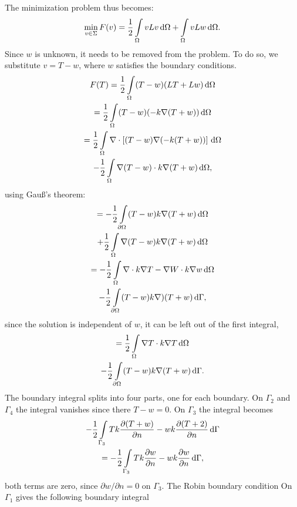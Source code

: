 The minimization problem thus becomes:
\begin{equation}
    \min_{v\in\Sigma} F(v)=\frac{1}{2}\int\displaylimits_{\Omega}vLv \,\mathrm{d}\Omega + \int\displaylimits_{\Omega}vLw \,\mathrm{d}\Omega.
\end{equation} Since $w$ is unknown, it needs to be removed from the problem. To do so, we substitute $v=T-w$, where $w$ satisfies the boundary conditions.
\begin{gather*}
    F(T) = \frac{1}{2}\int\displaylimits_\Omega(T-w)(LT+Lw) \,\mathrm{d}\Omega\\
    = \frac{1}{2}\int\displaylimits_{\Omega}(T-w)(-k\nabla (T+w)) \,\mathrm{d}\Omega\\
    = \frac{1}{2}\int\displaylimits_{\Omega}\nabla\cdot\left[(T-w)\nabla(-k(T+w))\right] \,\mathrm{d}\Omega\\
    - \frac{1}{2}\int\displaylimits_{\Omega}\nabla(T-w)\cdot k\nabla(T+w) \,\mathrm{d}\Omega,
\end{gather*}using Gau\ss's theorem:
\begin{gather*}
    = -\frac{1}{2}\int\displaylimits_{\partial\Omega}(T-w)k\nabla(T+w) \,\mathrm{d}\Omega\\
    + \frac{1}{2}\int\displaylimits_{\Omega}\nabla(T-w)k\nabla(T+w) \,\mathrm{d}\Omega\\
    = -\frac{1}{2}\int\displaylimits_{\Omega}\nabla\cdot k\nabla T - \nabla W\cdot k\nabla w \,\mathrm{d}\Omega\\
    -\frac{1}{2}\int\displaylimits_{\partial\Omega}(T-w)k\nabla)(T+w)\,\mathrm{d}\Gamma,
\end{gather*}since the solution is independent of $w$, it can be left out of the first integral,
\begin{gather*}
    = \frac{1}{2}\int\displaylimits_{\Omega}\nabla T\cdot k\nabla T \,\mathrm{d}\Omega \\
    -\frac{1}{2}\int\displaylimits_{\partial\Omega}(T-w)k\nabla (T+w)\,\mathrm{d}\Gamma.
\end{gather*} The boundary integral splits into four parts, one for each boundary. On $\Gamma_2$ and $\Gamma_4$ the integral vanishes since there $T-w=0$. On $\Gamma_3$ the integral becomes
\begin{gather*}
    -\frac{1}{2}\int\displaylimits_{\Gamma_3} T k \frac{\partial(T+w)}{\partial n} - wk\frac{\partial (T+2)}{\partial n}\,\mathrm{d}\Gamma\\
    = -\frac{1}{2}\int\displaylimits_{\Gamma_3} T k \frac{\partial w}{\partial n} - w k \frac{\partial w}{\partial n} \,\mathrm{d}\Gamma,
\end{gather*} both terms are zero, since $\partial w/\partial n = 0$ on $\Gamma_3$. The Robin boundary condition On $\Gamma_1$ gives the following boundary integral 
